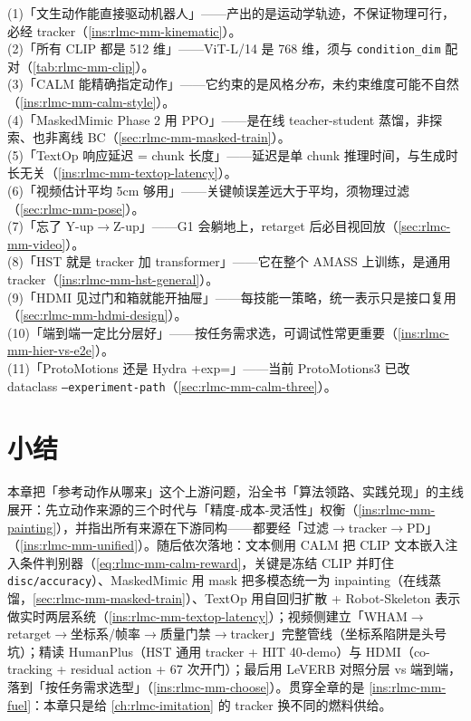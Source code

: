 \begin{pitfall}[本章常见误解一览]
(1)「文生动作能直接驱动机器人」——产出的是运动学轨迹，不保证物理可行，必经 tracker（\cref{ins:rlmc-mm-kinematic}）。\\
(2)「所有 CLIP 都是 512 维」——ViT-L/14 是 768 维，须与 \verb|condition_dim| 配对（\cref{tab:rlmc-mm-clip}）。\\
(3)「CALM 能精确指定动作」——它约束的是风格\emph{分布}，未约束维度可能不自然（\cref{ins:rlmc-mm-calm-style}）。\\
(4)「MaskedMimic Phase 2 用 PPO」——是在线 teacher-student 蒸馏，非探索、也非离线 BC（\cref{sec:rlmc-mm-masked-train}）。\\
(5)「TextOp 响应延迟 = chunk 长度」——延迟是单 chunk 推理时间，与生成时长无关（\cref{ins:rlmc-mm-textop-latency}）。\\
(6)「视频估计平均 5cm 够用」——关键帧误差远大于平均，须物理过滤（\cref{sec:rlmc-mm-pose}）。\\
(7)「忘了 Y-up$\to$Z-up」——G1 会躺地上，retarget 后必目视回放（\cref{sec:rlmc-mm-video}）。\\
(8)「HST 就是 tracker 加 transformer」——它在整个 AMASS 上训练，是通用 tracker（\cref{ins:rlmc-mm-hst-general}）。\\
(9)「HDMI 见过门和箱就能开抽屉」——每技能一策略，统一表示只是接口复用（\cref{sec:rlmc-mm-hdmi-design}）。\\
(10)「端到端一定比分层好」——按任务需求选，可调试性常更重要（\cref{ins:rlmc-mm-hier-vs-e2e}）。\\
(11)「ProtoMotions 还是 Hydra +exp=」——当前 ProtoMotions3 已改 dataclass \texttt{--experiment-path}（\cref{sec:rlmc-mm-calm-three}）。
\end{pitfall}

\section*{小结}
\label{sec:rlmc-mm-summary}

本章把「参考动作从哪来」这个上游问题，沿全书「算法领路、实践兑现」的主线展开：先立动作来源的三个时代与「精度-成本-灵活性」权衡（\cref{ins:rlmc-mm-painting}），并指出所有来源在下游同构——都要经「过滤$\to$tracker$\to$PD」（\cref{ins:rlmc-mm-unified}）。随后依次落地：文本侧用 CALM 把 CLIP 文本嵌入注入条件判别器（\cref{eq:rlmc-mm-calm-reward}，关键是冻结 CLIP 并盯住 \verb|disc/accuracy|）、MaskedMimic 用 mask 把多模态统一为 inpainting（在线蒸馏，\cref{sec:rlmc-mm-masked-train}）、TextOp 用自回归扩散 + Robot-Skeleton 表示做实时两层系统（\cref{ins:rlmc-mm-textop-latency}）；视频侧建立「WHAM$\to$retarget$\to$坐标系/帧率$\to$质量门禁$\to$tracker」完整管线（坐标系陷阱是头号坑）；精读 HumanPlus（HST 通用 tracker + HIT 40-demo）与 HDMI（co-tracking + residual action + 67 次开门）；最后用 LeVERB 对照分层 vs 端到端，落到「按任务需求选型」（\cref{ins:rlmc-mm-choose}）。贯穿全章的是 \cref{ins:rlmc-mm-fuel}：本章只是给 \cref{ch:rlmc-imitation} 的 tracker 换不同的燃料供给。

